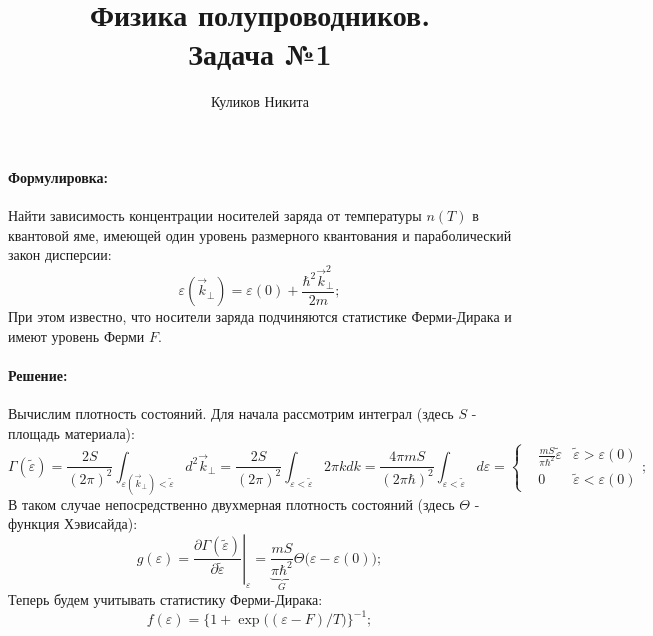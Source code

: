 \documentclass[a4paper, 14pt, russian]{article}
\title{Физика полупроводников.\\
        Задача №1}
\author{Куликов Никита}
\date{}
\newcommand{\pa}{\partial}
\newcommand{\vep}{\varepsilon}
\begin{document}
    \maketitle

    \paragraph{Формулировка:} Найти зависимость концентрации
        носителей заряда от температуры $n(T)$ в квантовой яме, имеющей 
        один уровень размерного квантования и параболический закон
        дисперсии:
        \begin{equation}
            \vep(\vec{k}_\perp) = \vep(0) + \frac{\hbar^2 \vec{k}_\perp^2}{2m};
        \end{equation}
        При этом известно, что носители заряда подчиняются статистике
        Ферми-Дирака и имеют уровень Ферми $F$.

    \paragraph{Решение:} Вычислим плотность состояний. Для начала рассмотрим
        интеграл (здесь $S$ - площадь материала):
        \begin{equation}
            \Gamma (\tilde \vep) = \frac{2S}{(2 \pi)^2} \int_{\vep(\vec{k}_\perp) < \tilde \vep} 
                d^2 \vec{k}_\perp = \frac{2S}{(2 \pi)^2}
                \int_{\vep < \tilde \vep} 2 \pi k dk = 
                \frac{4 \pi m S}{(2 \pi \hbar)^2} \int_{\vep < \tilde \vep} 
                d\vep = 
                \left\{\begin{aligned}
                    &  \frac{m S}{\pi \hbar^2} \tilde \vep & \tilde \vep > \vep(0)\\
                    &  0                                 & \tilde \vep < \vep(0)
                \end{aligned}\right.;
        \end{equation}
        В таком случае непосредственно двухмерная плотность состояний (здесь $\Theta$ - функция Хэвисайда):
        \begin{equation}
            g(\vep) = \left. \frac{\pa \Gamma(\tilde \vep)}{\pa \tilde \vep} \right\rvert_{\vep}
                = \underbrace{\frac{mS}{\pi \hbar^2}}_{G} \Theta\big(\vep - \vep(0)\big); 
        \end{equation}
        Теперь будем учитывать статистику Ферми-Дирака:
        \begin{equation}
            f(\vep) = \Big\{1 + \exp\big((\vep - F) / T\big)\Big\}^{-1};
        \end{equation}
\end{document}
